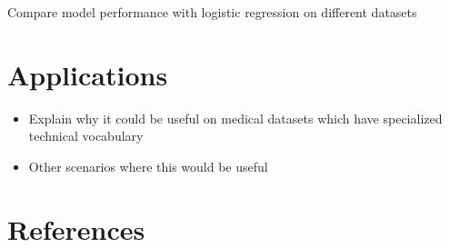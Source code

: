 Compare model performance with logistic regression on different datasets

\chapter{Applications}

\begin{itemize}
\item Explain why it could be useful on medical datasets which have specialized technical vocabulary

\item Other scenarios where this would be useful
\end{itemize}

\chapter{References}

